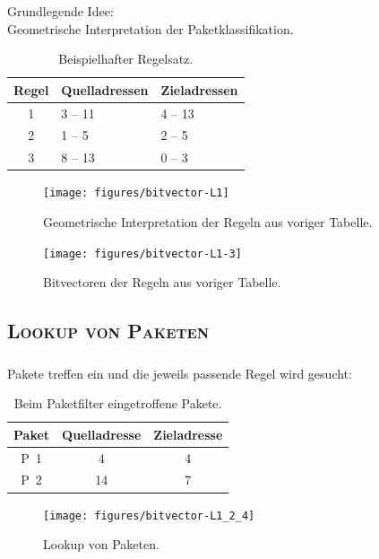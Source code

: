 \documentclass[xcolor=x11names,compress]{beamer}
\renewcommand{\(}{\begin{columns}}
\renewcommand{\)}{\end{columns}}
\newcommand{\<}[1]{\begin{column}{#1}}
\renewcommand{\>}{\end{column}}
\begin{document}
\begin{frame}
  Grundlegende Idee:\\
  Geometrische Interpretation der Paketklassifikation.
  \pause
  \begin{table}
  \centering
  \begin{tabularx}{0.7\textwidth}{c|X|X}
  Regel&Quelladressen&Zieladressen\\
  \hline
  1&3 -- 11&4 -- 13\\
  2&1 -- 5&2 -- 5\\
  3&8 -- 13&0 -- 3\\
  \end{tabularx}
  \caption{Beispielhafter Regelsatz.}
  \end{table}
\end{frame}

\begin{frame}
  \begin{figure}
  \centering
  \texttt{[image: figures/bitvector-L1]}
  \caption{Geometrische Interpretation der Regeln aus voriger Tabelle.}
  \end{figure}
\end{frame}

\begin{frame}
  \begin{figure}
  \centering
  \texttt{[image: figures/bitvector-L1-3]}
  \caption{Bitvectoren der Regeln aus voriger Tabelle.}
  \end{figure}
\end{frame}

\subsection{\scshape Lookup von Paketen}
\begin{frame}
  \frametitle{\insertsubsection}
  Pakete treffen ein und die jeweils passende Regel wird gesucht:
  \begin{table}
  \centering
  \begin{tabularx}{0.6\textwidth}{c|c|c}
  Paket&Quelladresse&Zieladresse\\
  \hline
  P\ 1&4&4\\
  P\ 2&14&7\\
  \end{tabularx}
  \caption{Beim Paketfilter eingetroffene Pakete.}
  \end{table}
\end{frame}

\begin{frame}
  \begin{figure}
  \centering
  \texttt{[image: figures/bitvector-L1\_2\_4]}
  \caption{Lookup von Paketen.}
  \end{figure}
\end{frame}
\end{document}
